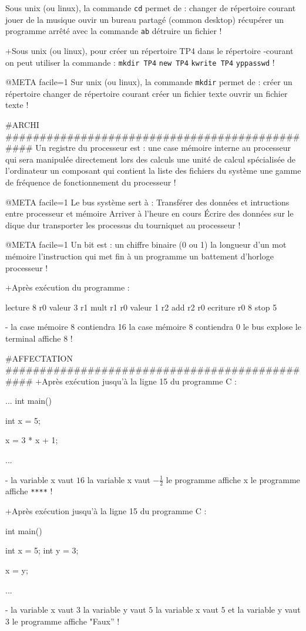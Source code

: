Sous unix (ou linux), la commande \verb|cd| permet de :
 changer de répertoire courant
 jouer de la musique
 ouvir un bureau partagé (common desktop)
 récupérer un programme arrêté avec la commande \verb|ab|
 détruire un fichier
!

+Sous unix (ou linux), pour créer un répertoire TP4 dans le répertoire
-courant on peut utiliser la commande :
 \verb+mkdir TP4+
 \verb+new TP4+
 \verb+kwrite TP4+
 \verb+yppasswd+
!

@META facile=1
Sur unix (ou linux), la commande \verb|mkdir| permet de :
  créer un répertoire
  changer de répertoire courant
  créer un fichier texte
  ouvrir un fichier texte
!



#ARCHI ###############################################
Un registre du processeur est :
 une case mémoire interne au processeur qui sera manipulée directement lors des calculs
 une unité de calcul spécialisée de l'ordinateur
 un composant qui contient la liste des fichiers du système
 une gamme de fréquence de fonctionnement du processeur
!

@META facile=1
Le bus système sert à :
 Transférer des données et intructions entre processeur et mémoire
 Arriver à l'heure en cours
 Écrire des données sur le dique dur
 transporter les processus du tourniquet au processeur
!

@META facile=1
Un bit est :
 un chiffre binaire (0 ou 1)
 la longueur d'un mot mémoire
 l'instruction qui met fin à un programme
 un battement d'horloge processeur
!


+Après exécution du programme :
\begin{listing}{1}
lecture 8 r0
valeur 3 r1
mult r1 r0
valeur 1 r2
add r2 r0
ecriture r0 8
stop
5
\end{listing}
-
 la case mémoire 8 contiendra 16
 la case mémoire 8 contiendra 0
 le bus explose
 le terminal affiche 8
!

#AFFECTATION ###############################################
+Après exécution jusqu'à la ligne 15 du programme  C :
\begin{listing}{10}
...
int main() {
    int x = 5;

    x = 3 * x + 1;

    ...
}
\end{listing}
-
 la variable x vaut $16$
 la variable x vaut $-\frac{1}{2}$
 le programme affiche x
 le programme affiche \verb+****+
!

+Après exécution jusqu'à la ligne 15 du programme  C :
\begin{listing}{10}
int main() {
    int x = 5;
    int y = 3;

    x = y;

    ...
}
\end{listing}
-
 la variable x vaut $3$
 la variable y vaut $5$
 la variable x vaut $5$ et la variable y vaut $3$
 le programme affiche "Faux''
!

